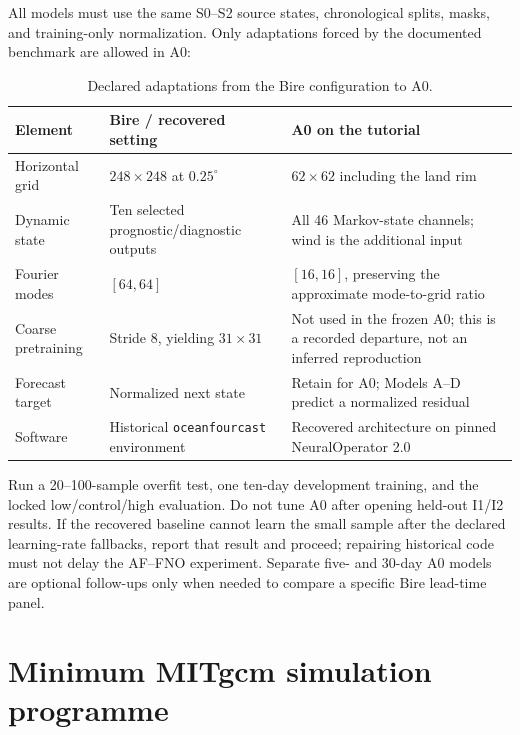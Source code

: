 \documentclass[11pt]{article}
\newcommand{\AF}{AF--FNO}
\begin{document}
All models must use the same S0--S2 source states, chronological splits, masks, and
training-only normalization. Only adaptations forced by the documented benchmark are
allowed in A0:

\begin{table}[htbp]\centering\small
\caption{Declared adaptations from the Bire configuration to A0.}
\label{tab:a0-adaptations}
\begin{tabularx}{\textwidth}{@{}p{}p{}Y@{}}
\toprule
\textbf{Element} & \textbf{Bire / recovered setting} & \textbf{A0 on the tutorial} \\
\midrule
Horizontal grid & \(248\times248\) at \(0.25^\circ\) & \(62\times62\) including the land rim \\
Dynamic state & Ten selected prognostic/diagnostic outputs & All 46 Markov-state channels; wind is the additional input \\
Fourier modes & \([64,64]\) & \([16,16]\), preserving the approximate mode-to-grid ratio \\
Coarse pretraining & Stride 8, yielding \(31\times31\) & Not used in the frozen A0; this is a recorded departure, not an inferred reproduction \\
Forecast target & Normalized next state & Retain for A0; Models A--D predict a normalized residual \\
Software & Historical \texttt{oceanfourcast} environment & Recovered architecture on pinned NeuralOperator 2.0 \\
\bottomrule
\end{tabularx}
\end{table}

Run a 20--100-sample overfit test, one ten-day development training, and the locked
low/control/high evaluation. Do not tune A0 after opening held-out I1/I2 results. If the
recovered baseline cannot learn the small sample after the declared learning-rate
fallbacks, report that result and proceed; repairing historical code must not delay the
\AF{} experiment. Separate five- and 30-day A0 models are optional follow-ups only when
needed to compare a specific Bire lead-time panel.

\section{Minimum MITgcm simulation programme}
\end{document}
